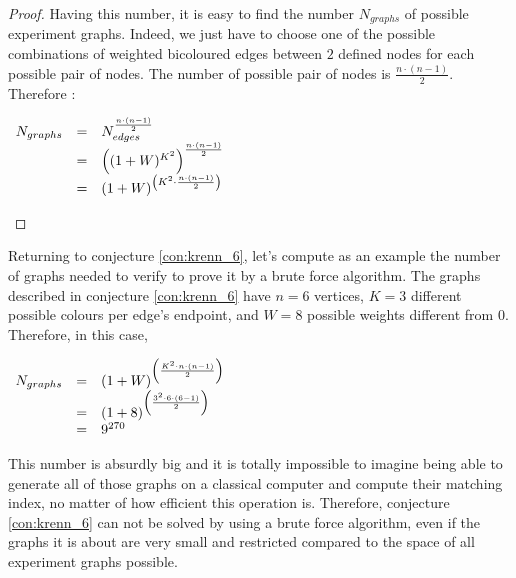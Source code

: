\begin{proof}
    Having this number, it is easy to find the number $N_{graphs}$ of possible experiment graphs.
    Indeed, we just have to choose one of the possible combinations of weighted bicoloured edges between $2$ defined nodes for each possible pair of nodes.
    The number of possible pair of nodes is $\frac{n \cdot (n-1)}{2}$.
    Therefore :

    \begin{center}
        $\begin{array}{r c l}
             N_{graphs} & = & N_{edges} ^ {\frac{n \cdot (n-1)}{2}}                      \\
             & = & \left((1 + W)^{K^2}\right)^{\frac{n \cdot (n-1)}{2}}       \\
             & = & (1 + W)^{\left({K^2} \cdot \frac{n \cdot (n-1)}{2}\right)} \\
        \end{array}$
    \end{center}
\end{proof}

Returning to conjecture \ref{con:krenn_6}, let's compute as an example the number of graphs needed to verify to prove it by a brute force algorithm. The graphs described in conjecture \ref{con:krenn_6} have $n = 6$ vertices, $K = 3$ different possible colours per edge's endpoint, and $W = 8$ possible weights different from $0$. Therefore, in this case,

\begin{center}
    $\begin{array}{r c l}
         N_{graphs} & = & (1 + W)^{\left(\frac{K^2 \cdot n \cdot (n-1)}{2}\right)} \\
         & = & (1 + 8)^{\left(\frac{3^2 \cdot 6 \cdot (6-1)}{2}\right)} \\
         & = & 9^{270}
    \end{array}$
\end{center}

This number is absurdly big and it is totally impossible to imagine being able to generate all of those graphs on a classical computer and compute their matching index, no matter of how efficient this operation is. Therefore, conjecture \ref{con:krenn_6} can not be solved by using a brute force algorithm, even if the graphs it is about are very small and restricted compared to the space of all experiment graphs possible. 






